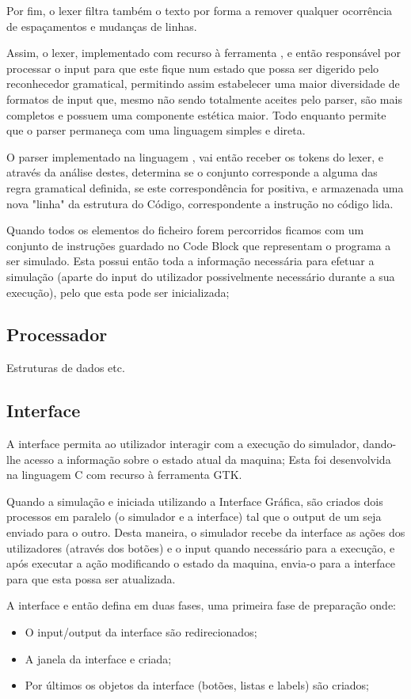 \documentclass{report}
\begin{document}
Por fim, o lexer filtra também o texto por forma a remover qualquer ocorrência de espaçamentos e mudanças de linhas.

\quad Assim, o lexer, implementado com recurso à ferramenta {\FLEX}, e então responsável por processar o input para que este fique num estado que possa ser digerido pelo reconhecedor gramatical,
permitindo assim estabelecer uma maior diversidade de formatos de input que, mesmo não sendo totalmente aceites pelo
parser, são mais completos e possuem uma componente estética maior. Todo enquanto permite que o parser permaneça com
uma linguagem simples e direta.

\quad O parser implementado na linguagem {\YACC}, vai então receber os tokens do lexer, e através da análise destes, determina se o conjunto
corresponde a alguma das regra gramatical definida, se este correspondência for positiva, e armazenada
uma nova "linha" da estrutura do Código, correspondente a instrução no código lida.

\quad Quando todos os elementos do ficheiro forem percorridos ficamos com um conjunto de instruções guardado no Code Block que
representam o programa a ser simulado. Esta possui então toda a informação necessária para
efetuar a simulação (aparte do input do utilizador possivelmente necessário
durante a sua execução), pelo que esta pode ser inicializada;

\subsection{Processador}
\quad Estruturas de dados etc.
\subsection{Interface}
\quad A interface permita ao utilizador interagir com a execução do simulador, dando-lhe acesso a informação sobre o estado atual da maquina;
Esta foi desenvolvida na linguagem C com recurso à ferramenta GTK.

Quando a simulação e iniciada utilizando a Interface Gráfica, são criados dois processos em paralelo (o simulador e a interface) tal que
o output de um seja enviado para o outro. Desta maneira, o simulador recebe da interface
as ações dos utilizadores (através dos botões) e o input quando necessário para a execução, e
após executar a ação modificando o estado da maquina,  envia-o para a interface para que esta possa ser atualizada.

A interface e então defina em duas fases, uma primeira fase de preparação onde:
\begin{itemize}
	\item O input/output da interface são redirecionados;
	\item A janela da interface e criada;
	\item Por últimos os objetos da interface (botões, listas e labels) são criados;
\end{itemize}
\end{document}
